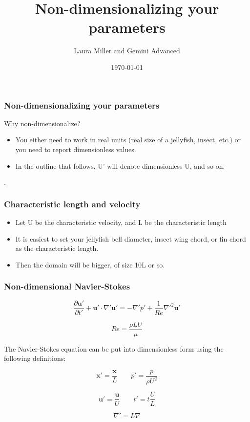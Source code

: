 \documentclass{beamer}
\title{Non-dimensionalizing your parameters}
\author{Laura Miller and Gemini Advanced}
\date{\today}
\begin{document}
\frame{\titlepage}

\begin{frame}
\frametitle{Non-dimensionalizing your parameters}
Why non-dimensionalize?
\begin{itemize}
\item You either need to work in real units (real size of a jellyfish, insect, etc.) or you need to report dimensionless values.
\item In the outline that follows, U’ will denote dimensionless U, and so on.
\end{itemize}.
\end{frame}

\begin{frame}
\frametitle{Characteristic length and velocity}
\begin{itemize}
\item Let U be the characteristic velocity, and L be the characteristic length
\item It is easiest to set your jellyfish bell diameter, insect wing chord, or fin chord as the characteristic length.
\item Then the domain will be bigger, of size 10L or so.
\end{itemize}
\end{frame}

\begin{frame}
\frametitle{Non-dimensional Navier-Stokes}
\begin{equation*}
\frac{\partial \mathbf{u}'}{\partial t'} + \mathbf{u}' \cdot \nabla' \mathbf{u}' = -\nabla' p' + \frac{1}{Re} \nabla'^2 \mathbf{u}'
\end{equation*}

\begin{equation*}
Re = \frac{\rho L U}{\mu}
\end{equation*}

The Navier-Stokes equation can be put into dimensionless form using the following definitions:

\begin{equation*}
\mathbf{x}' = \frac{\mathbf{x}}{L} \qquad p' = \frac{p}{\rho U^2}
\end{equation*}

\begin{equation*}
\mathbf{u}' = \frac{\mathbf{u}}{U} \qquad t' = t \frac{U}{L}
\end{equation*}

\begin{equation*}
\nabla' = L \nabla
\end{equation*}

\end{frame}
\end{document}
